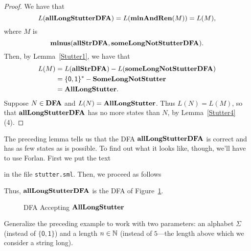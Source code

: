 \begin{proof}
We have that
\begin{displaymath}
L(\mathbf{allLongStutterDFA}) = L(\mathbf{minAndRen}(M)) = L(M) ,
\end{displaymath}
where $M$ is
\begin{displaymath}
\mathbf{minus}(\mathbf{allStrDFA}, \mathbf{someLongNotStutterDFA}) .
\end{displaymath}
Then, by Lemma~\ref{Stutter1}, we have that
\begin{align*}
L(M) &= L(\mathbf{allStrDFA}) - L(\mathbf{someLongNotStutterDFA}) \\
&= \{\mathsf{0,1}\}^* - \mathbf{SomeLongNotStutter } \\
&= \mathbf{AllLongStutter} .
\end{align*}
Suppose $N\in\mathbf{DFA}$ and $L(N)=\mathbf{AllLongStutter}$.  Thus $L(N)=L(M)$, so
that $\mathbf{allLongStutterDFA}$ has no more states than $N$, by
Lemma~\ref{Stutter4}(4).
\end{proof}

The preceding lemma tells us that the DFA $\mathbf{allLongStutterDFA}$
is correct and has as few states as is possible.
To find out what it looks like, though, we'll have to use
Forlan.  First we put the text


%
%
%
%
%
%
%
%
%
%
%
%
%
%
%
in the file \texttt{stutter.sml}.  Then, we proceed as follows

Thus, $\mathbf{allLongStutterDFA}$ is the DFA of Figure~\ref{StuttDFASynExamp}.
\begin{figure}
\begin{center}

\end{center}
\caption{DFA Accepting $\mathbf{AllLongStutter}$}
\label{StuttDFASynExamp}
\end{figure}

\begin{exercise}
\label{StutGen}
Generalize the preceding example to work with two parameters: an alphabet
$\Sigma$ (instead of $\{\mathsf{0,1}\}$) and a length $n\in\mathbb{N}$ (instead
of $5$---the length above which we consider a string long).
\end{exercise}

